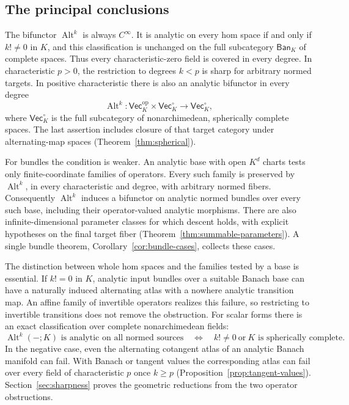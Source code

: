 \documentclass[11pt]{amsart}
\theoremstyle{definition}
\theoremstyle{remark}
\numberwithin{equation}{section}
\newcommand{\Alt}{\operatorname{Alt}}
\begin{document}
\subsection*{The principal conclusions}
The bifunctor $\Alt^k$ is always $C^\infty$. It is analytic on every hom space if and only if $k!\ne0$
in $K$, and this classification is unchanged on the full subcategory $\mathsf{Ban}_K$ of complete
spaces. Thus every characteristic-zero field is covered in every degree. In characteristic $p>0$,
the restriction to degrees $k<p$ is sharp for arbitrary normed targets. In positive characteristic
there is also an analytic bifunctor in every degree
\[
 \Alt^k\colon\mathsf{Vec}_K^{\mathrm{op}}\times\mathsf{Vec}_K^\circ
 \longrightarrow\mathsf{Vec}_K^\circ,
\]
where $\mathsf{Vec}_K^\circ$ is the full subcategory of nonarchimedean, spherically complete spaces.
The last assertion includes closure of that target category under alternating-map spaces
(Theorem~\ref{thm:spherical}).

For bundles the condition is weaker. An analytic base with open $K^d$ charts tests only
finite-coordinate families of operators. Every such family is preserved by $\Alt^k$, in every
characteristic and degree, with arbitrary normed fibers. Consequently $\Alt^k$ induces a bifunctor
on analytic normed bundles over every such base, including their operator-valued analytic morphisms.
There are also infinite-dimensional parameter classes for which descent holds, with explicit
hypotheses on the final target fiber (Theorem~\ref{thm:summable-parameters}). A single bundle theorem,
Corollary~\ref{cor:bundle-cases}, collects these cases.

The distinction between whole hom spaces and the families tested by a base is essential. If $k!=0$
in $K$, analytic input bundles over a suitable Banach base can have a naturally induced alternating
atlas with a nowhere analytic transition map. An affine family of invertible operators realizes this
failure, so restricting to invertible transitions does not remove the obstruction. For scalar forms
there is an exact classification over complete nonarchimedean fields:
\[
 \Alt^k(-;K)\text{ is analytic on all normed sources}
 \quad\Longleftrightarrow\quad
 k!\ne0\ \text{or}\ K\text{ is spherically complete}.
\]
In the negative case, even the alternating cotangent atlas of an analytic Banach manifold can fail.
With Banach or tangent values the corresponding atlas can fail over every field of characteristic $p$ once $k\ge p$
(Proposition~\ref{prop:tangent-values}).
Section~\ref{sec:sharpness} proves the geometric reductions from the two operator obstructions.
\end{document}
